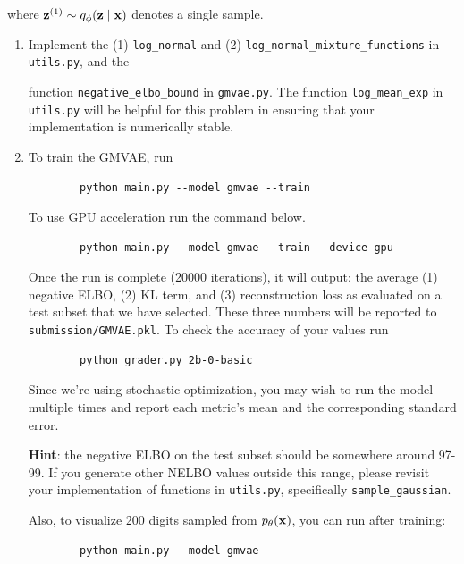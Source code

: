 where $\mathbf{z}^{(1)} \sim q_{\phi}(\mathbf{z} \mid \mathbf{x})$ denotes a single sample.

\begin{enumerate}[label=(\alph*)]
    \item {} Implement the (1) \texttt{log\_normal} and (2) \texttt{log\_normal\_mixture\_functions} in \texttt{utils.py}, and the 

    function \texttt{negative\_elbo\_bound} in \texttt{gmvae.py}. The function \texttt{log\_mean\_exp} in \texttt{utils.py} 
    will be helpful for this problem in ensuring that your implementation is numerically stable.

    \clearpage

    \item {} To train the GMVAE, run 
    \begin{verbatim}
        python main.py --model gmvae --train
    \end{verbatim}
    
    To use GPU acceleration run the command below.
    \begin{verbatim}
        python main.py --model gmvae --train --device gpu
    \end{verbatim}
    
    Once the run is complete (20000 iterations), it will output: the average (1) negative ELBO, (2) KL term, and (3) reconstruction loss as 
    evaluated on a test subset that we have selected. These three numbers will be reported to \texttt{submission/GMVAE.pkl}. To check the accuracy 
    of your values run

    \begin{verbatim}
        python grader.py 2b-0-basic
    \end{verbatim}
    
    Since we’re using stochastic optimization, you may wish to run the model multiple times and report each metric’s mean
    and the corresponding standard error. 
    
    \textbf{Hint}: the negative ELBO on the test subset should be somewhere around 97-99. If you generate other NELBO values outside this range, please
    revisit your implementation of functions in \texttt{utils.py}, specifically \texttt{sample\_gaussian}.

    Also, to visualize 200 digits sampled from $p_{\theta}(\mathbf{x})$, you can run after training: 
    \begin{verbatim}
        python main.py --model gmvae
    \end{verbatim}
    

\end{enumerate}
